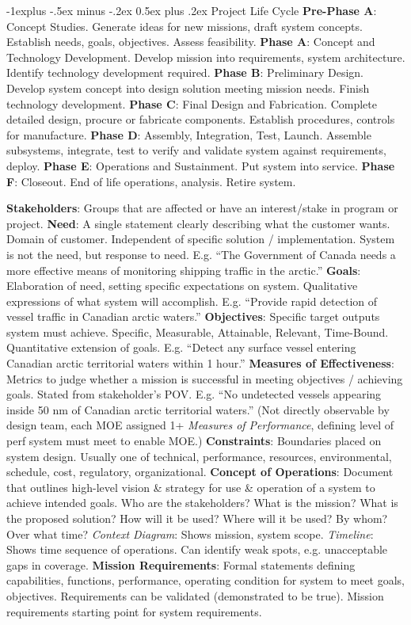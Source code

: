 \documentclass[letterpaper, 8pt]{extarticle}
\makeatletter
\renewcommand{\subsection}{\@startsection{subsection}{2}{0mm}%
                                {-1explus -.5ex minus -.2ex}%
                                {0.5ex plus .2ex}%
                                {\normalfont\tiny\bfseries}}
\makeatother
\begin{document}
\begin{multicols*}{5}
\subsection{Project Life Cycle}
\textbf{Pre-Phase A}:
Concept Studies.
Generate ideas for new missions, draft system concepts.
Establish needs, goals, objectives. Assess feasibility.
\textbf{Phase A}:
Concept and Technology Development.
Develop mission into requirements, system architecture.
Identify technology development required.
\textbf{Phase B}:
Preliminary Design.
Develop system concept into design solution meeting mission needs.
Finish technology development.
\textbf{Phase C}:
Final Design and Fabrication.
Complete detailed design, procure or fabricate components.
Establish procedures, controls for manufacture.
\textbf{Phase D}:
Assembly, Integration, Test, Launch.
Assemble subsystems, integrate,
test to verify and validate system against requirements, deploy.
\textbf{Phase E}:
Operations and Sustainment.
Put system into service.
\textbf{Phase F}:
Closeout.
End of life operations, analysis. Retire system.

\textbf{Stakeholders}:
Groups that are affected or have an interest/stake in program or project.
\textbf{Need}:
A single statement clearly describing what the customer wants.
Domain of customer. Independent of specific solution / implementation.
System is not the need, but response to need.
E.g. ``The Government of Canada needs a more effective means of monitoring shipping traffic in the arctic.''
\textbf{Goals}:
Elaboration of need, setting specific expectations on system.
Qualitative expressions of what system will accomplish.
E.g. ``Provide rapid detection of vessel traffic in Canadian arctic waters.''
\textbf{Objectives}:
Specific target outputs system must achieve.
Specific, Measurable, Attainable, Relevant, Time-Bound.
Quantitative extension of goals.
E.g. ``Detect any surface vessel entering Canadian arctic territorial waters within 1 hour.''
\textbf{Measures of Effectiveness}:
Metrics to judge whether a mission is successful in meeting objectives / achieving goals.
Stated from stakeholder's POV.
E.g. ``No undetected vessels appearing inside 50 nm of Canadian arctic territorial waters.''
(Not directly observable by design team, each MOE assigned 1+ \textit{Measures of Performance},
defining level of perf system must meet to enable MOE.)
\textbf{Constraints}:
Boundaries placed on system design. Usually one of
technical, performance, resources, environmental,
schedule, cost, regulatory, organizational.
\textbf{Concept of Operations}:
Document that outlines high-level vision \& strategy for use \& operation of a system to achieve intended goals.
Who are the stakeholders?
What is the mission?
What is the proposed solution?
How will it be used?
Where will it be used?
By whom?
Over what time?
\textit{Context Diagram}:
Shows mission, system scope.
\textit{Timeline}:
Shows time sequence of operations.
Can identify weak spots, e.g. unacceptable gaps in coverage.
\textbf{Mission Requirements}:
Formal statements defining capabilities, functions, performance, operating condition for system to meet goals, objectives.
Requirements can be validated (demonstrated to be true).
Mission requirements starting point for system requirements.


\end{multicols*}
\end{document}
